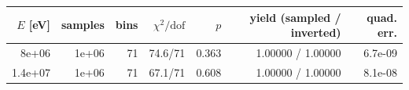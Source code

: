 \begin{tabular}{rrrrrrr}
\toprule
$E$ [eV] & samples & bins & $\chi^2/\mathrm{dof}$ & $p$ & yield (sampled / inverted) & quad. err. \\
\midrule
8e+06 & 1e+06 & 71 & 74.6/71 & 0.363 & 1.00000 / 1.00000 & 6.7e-09 \\
1.4e+07 & 1e+06 & 71 & 67.1/71 & 0.608 & 1.00000 / 1.00000 & 8.1e-08 \\
\bottomrule
\end{tabular}
